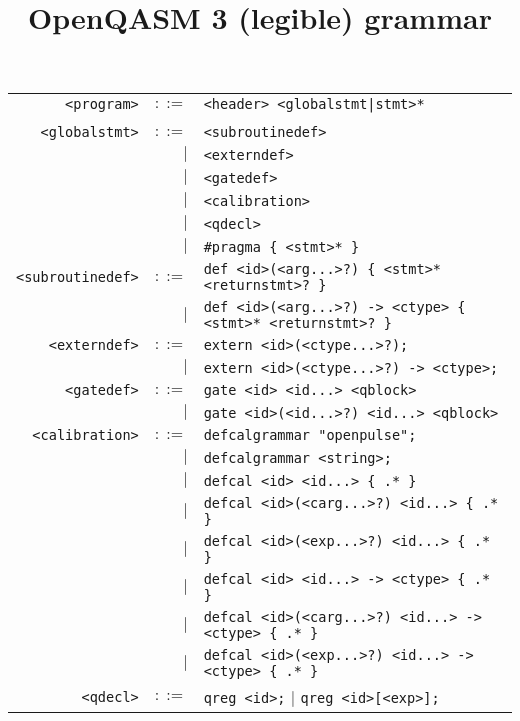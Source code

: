 \documentclass[notitlepage]{article}
\title{OpenQASM 3 (legible) grammar}
\date{\vspace{-10ex}}
\begin{document}
\maketitle

\begin{longtable}{rrl}
	\texttt{<program>} & $::=$ & \texttt{<header> <globalstmt|stmt>*} \\ \\
	\texttt{<globalstmt>} & $::=$ & \texttt{<subroutinedef>} \\
	    & $\mid$ & \texttt{<externdef>} \\
	    & $\mid$ & \texttt{<gatedef>} \\
	    & $\mid$ & \texttt{<calibration>} \\
	    & $\mid$ & \texttt{<qdecl>} \\
	    & $\mid$ & \texttt{\#pragma \{ <stmt>* \}} \\
	\texttt{<subroutinedef>} & $::=$ & \texttt{def <id>(<arg...>?) \{ <stmt>* <returnstmt>? \}} \\
	    & $\mid$ & \texttt{def <id>(<arg...>?) -> <ctype> \{ <stmt>* <returnstmt>? \}} \\
	\texttt{<externdef>} & $::=$ & \texttt{extern <id>(<ctype...>?);} \\
	    & $\mid$ & \texttt{extern <id>(<ctype...>?) -> <ctype>;} \\
	\texttt{<gatedef>} & $::=$ & \texttt{gate <id> <id...> <qblock>} \\
	    & $\mid$ & \texttt{gate <id>(<id...>?) <id...> <qblock>} \\
	\texttt{<calibration>} & $::=$ & \texttt{defcalgrammar "openpulse";} \\
	    & $\mid$ & \texttt{defcalgrammar <string>;} \\
	    & $\mid$ & \texttt{defcal <id> <id...> \{ .* \}} \\
	    & $\mid$ & \texttt{defcal <id>(<carg...>?) <id...> \{ .* \}} \\
	    & $\mid$ & \texttt{defcal <id>(<exp...>?) <id...> \{ .* \}} \\
	    & $\mid$ & \texttt{defcal <id> <id...> -> <ctype> \{ .* \}} \\
	    & $\mid$ & \texttt{defcal <id>(<carg...>?) <id...> -> <ctype> \{ .* \}} \\
	    & $\mid$ & \texttt{defcal <id>(<exp...>?) <id...> -> <ctype> \{ .* \}} \\
	\texttt{<qdecl>} & $::=$ & \texttt{qreg <id>;} $\mid$ \texttt{qreg <id>[<exp>];} \\

\end{longtable}
\end{document}
